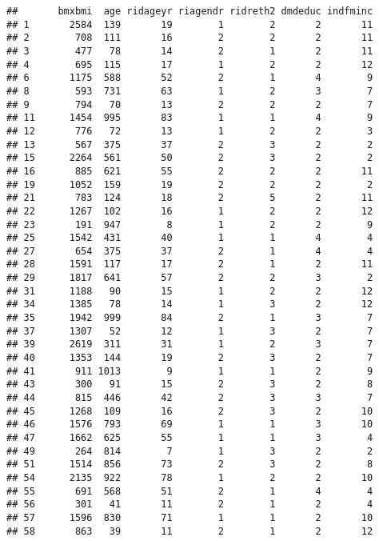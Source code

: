 \documentclass[]{article}
\begin{document}
\begin{verbatim}
##       bmxbmi  age ridageyr riagendr ridreth2 dmdeduc indfminc
## 1       2584  139       19        1        2       2       11
## 2        708  111       16        2        2       2       11
## 3        477   78       14        2        1       2       11
## 4        695  115       17        1        2       2       12
## 6       1175  588       52        2        1       4        9
## 8        593  731       63        1        2       3        7
## 9        794   70       13        2        2       2        7
## 11      1454  995       83        1        1       4        9
## 12       776   72       13        1        2       2        3
## 13       567  375       37        2        3       2        2
## 15      2264  561       50        2        3       2        2
## 16       885  621       55        2        2       2       11
## 19      1052  159       19        2        2       2        2
## 21       783  124       18        2        5       2       11
## 22      1267  102       16        1        2       2       12
## 23       191  947        8        1        2       2        9
## 25      1542  431       40        1        1       4        4
## 27       654  375       37        2        1       4        4
## 28      1591  117       17        2        1       2       11
## 29      1817  641       57        2        2       3        2
## 31      1188   90       15        1        2       2       12
## 34      1385   78       14        1        3       2       12
## 35      1942  999       84        2        1       3        7
## 37      1307   52       12        1        3       2        7
## 39      2619  311       31        1        2       3        7
## 40      1353  144       19        2        3       2        7
## 41       911 1013        9        1        1       2        9
## 43       300   91       15        2        3       2        8
## 44       815  446       42        2        3       3        7
## 45      1268  109       16        2        3       2       10
## 46      1576  793       69        1        1       3       10
## 47      1662  625       55        1        1       3        4
## 49       264  814        7        1        3       2        2
## 51      1514  856       73        2        3       2        8
## 54      2135  922       78        1        2       2       10
## 55       691  568       51        2        1       4        4
## 56       301   41       11        2        1       2        4
## 57      1596  830       71        1        1       2       10
## 58       863   39       11        2        1       2       12

\end{verbatim}
\end{document}

